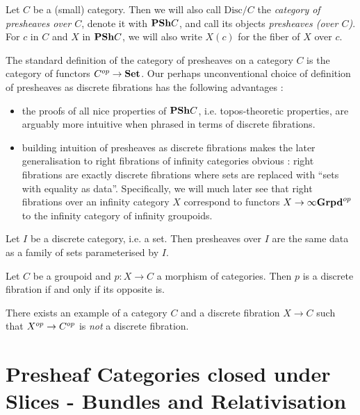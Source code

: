 \documentclass{article}
\begin{document}
\begin{dfn}
  
  Let $ C$ be a (small) category.
  Then we will also call $\mathrm{Disc}/ C$ the
  \emph{category of presheaves over $ C$},
  denote it with $\mathbf{PSh} C$,
  and call its objects \emph{presheaves (over $ C$)}.
  For $c$ in $C$ and $X$ in $\mathbf{PSh} C$,
  we will also write $X(c)$ for the fiber of $X$ over $c$.
\end{dfn}

\begin{rmk}
  The standard definition of the category of presheaves on a category $C$
  is the category of functors $C^{op} \to \mathbf{Set}$.
  Our perhaps unconventional choice of definition of presheaves as
  discrete fibrations has the following advantages : 
  \begin{itemize}
    \item the proofs of all nice properties of $\mathbf{PSh} C$,
    i.e. topos-theoretic properties, are arguably more intuitive
    when phrased in terms of discrete fibrations.
    \item building intuition of presheaves as discrete fibrations
    makes the later generalisation to right fibrations of infinity categories
    obvious : 
    right fibrations are exactly discrete fibrations
    where sets are replaced with ``sets with equality as data''.
    Specifically, we will much later see that
    right fibrations over an infinity category $X$
    correspond to functors $X \to \infty\mathbf{Grpd}^{op}$
    to the infinity category of infinity groupoids.
  \end{itemize}
\end{rmk}

\begin{eg}
  
  Let $I$ be a discrete category, i.e. a set.
  Then presheaves over $I$ are the same data as
  a family of sets parameterised by $I$.
\end{eg}

\begin{eg}
  Let $C$ be a groupoid and $p : X \to C$ a morphism of categories.
  Then $p$ is a discrete fibration if and only if its opposite is.

  There exists an example of a category $C$ and a discrete fibration $X \to C$
  such that $X^{op} \to C^{op}$ is \emph{not} a discrete fibration.
\end{eg}

\section{Presheaf Categories closed under Slices - 
  Bundles and Relativisation}
\end{document}
